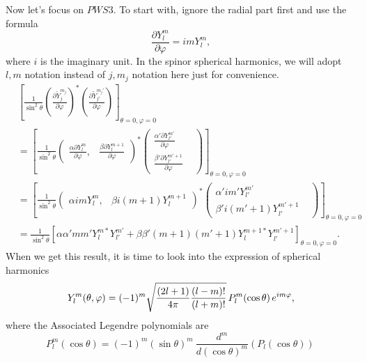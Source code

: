 \documentclass[british,english]{article}
\numberwithin{equation}{section}
\numberwithin{figure}{section}
\begin{document}
Now let's focus on $PWS3$. To start with, ignore the radial part first and use the formula
\begin{equation}
\frac{\partial Y^m_l}{\partial \varphi}=imY^m_l,
\end{equation}
where $i$ is the imaginary unit. In the spinor spherical harmonics, we will adopt $l,m$ notation instead of $j,m_j$ notation here just for convenience. 
\begin{equation}
\begin{aligned}
&\left[\frac{1}{\sin^2\theta}\left(\frac{\partial \tilde{Y}_j^{m_j}}{\partial \varphi}\right)^* \left(\frac{\partial \tilde{Y}_{j'}^{m_j'}}{\partial \varphi}\right)\right]_{\theta=0,\varphi=0}\\
&=\left[\frac{1}{\sin^2\theta} \begin{pmatrix} \frac{\alpha\partial Y_l^{m}}{\partial \varphi},&\frac{\beta\partial Y_l^{m+1}}{\partial \varphi}\end{pmatrix}^*\begin{pmatrix} \frac{\alpha'\partial Y_{l'}^{m'}}{\partial \varphi} &\\
\frac{\beta' \partial Y_{l'}^{m'+1}}{\partial \varphi} &
\end{pmatrix}\right]_{\theta=0,\varphi=0}\\
&=\left[\frac{1}{\sin^2\theta} \begin{pmatrix} \alpha i m Y_l^{m},&\beta i(m+1)Y_l^{m+1}\end{pmatrix}^*\begin{pmatrix} \alpha'im' Y_{l'}^{m'} &\\
\beta' i(m'+1) Y_{l'}^{m'+1} &
\end{pmatrix}\right]_{\theta=0,\varphi=0}\\
&=\frac{1}{\sin^2\theta}\left[\alpha\alpha'mm'Y_l^{m*} Y_{l'}^{m'}+\beta\beta'(m+1)(m'+1)Y_{l}^{m+1*}Y_{l'}^{m'+1}\right]_{\theta=0,\varphi=0}.
\end{aligned}
\label{equ:pws3}
\end{equation}
When we get this result, it is time to look into the expression of spherical harmonics
\begin{equation}
Y_{l }^{m}(\theta ,\varphi )=(-1)^{m}{\sqrt {{(2l +1) \over 4\pi }{(l -m)! \over (l +m)!}}}\,P_{l }^{m}(\cos {\theta })\,e^{im\varphi },
\end{equation} 
where the Associated Legendre polynomials are
\begin{equation}
P_{l }^{m}(\cos \theta )=(-1)^{m}(\sin \theta )^{m}\ {\frac {d^{m}}{d(\cos \theta )^{m}}}\left(P_{l }(\cos \theta )\right)\,
\end{equation}
\end{document}

